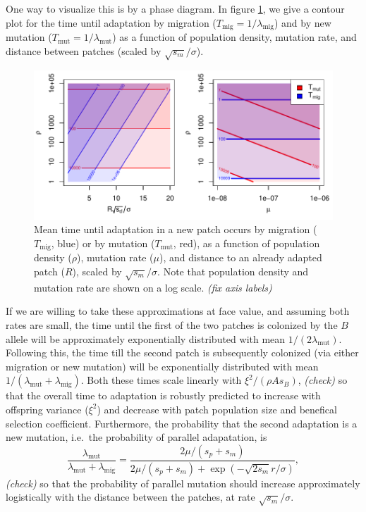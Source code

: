 \documentclass{article}
\newcommand{\migrate}{\lambda_\text{mig}}
\newcommand{\mutrate}{\lambda_\text{mut}}
\newcommand{\Tmig}{T_\text{mig}}
\newcommand{\Tmut}{T_\text{mut}}
\newcommand{\plr}[1]{{\it\color{blue}(#1)}}
\begin{document}
One way to visualize this is by a phase diagram.
In figure \ref{fig:phase_diagram},
we give a contour plot for the time until adaptation by migration ($\Tmig = 1/\migrate$) and by new mutation ($\Tmut=1/\mutrate$)
as a function of population density, mutation rate, and distance between patches (scaled by $\sqrt{s_m}/\sigma$).

\begin{figure}[ht]
  \begin{center}
    \includegraphics{phase-diagram-log}
  \end{center}
  \caption{
  Mean time until adaptation in a new patch occurs by migration ($\Tmig$, blue) or by mutation ($\Tmut$, red),
  as a function of population density ($\rho$), mutation rate ($\mu$), 
  and distance to an already adapted patch ($R$), scaled by $\sqrt{s_m}/\sigma$.
  Note that population density and mutation rate are shown on a log scale.
  \plr{fix axis labels}
  \label{fig:phase_diagram}
  }
\end{figure}

If we are willing to take these approximations at face value, 
and assuming both rates are small, 
the time until the first of the two patches is colonized by the $B$ allele will be approximately exponentially distributed with mean $1/(2 \mutrate)$.
Following this, the time till the second patch is subsequently colonized 
(via either migration or new mutation) 
will be exponentially distributed with mean $1/(\mutrate+\migrate)$.
Both these times scale linearly with $\xi^2/(\rho A s_{B})$, \plr{check}
so that the overall time to adaptation is robustly predicted to increase with offspring variance ($\xi^2$)
and decrease with patch population size and benefical selection coefficient.
Furthermore, the probability that the second adaptation is a new mutation,
i.e.\ the probability of parallel adapatation, is
\begin{equation}
  \frac{\mutrate}{\mutrate+\migrate} = \frac{2\mu/(s_p+s_m)}{2\mu/(s_p+s_m) + \exp\left(- \sqrt{2 s_m} r / \sigma \right) },
\end{equation}
\plr{check}
so that the probability of parallel mutation should increase
approximately logistically with the distance between the patches, at rate $\sqrt{s_m} /\sigma$. 
\end{document}
